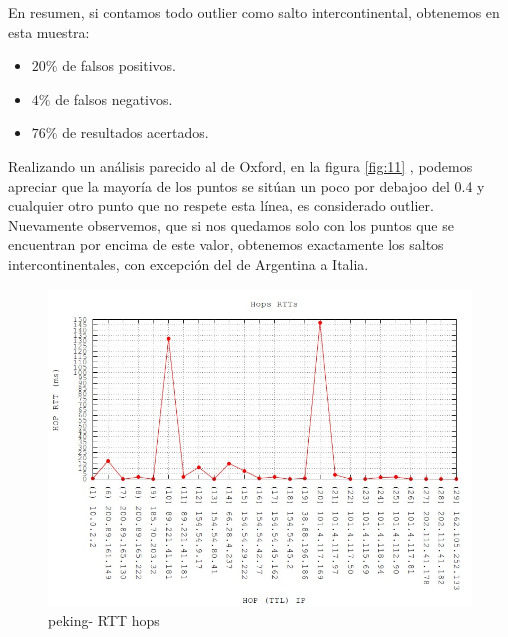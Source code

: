 En resumen, si contamos todo outlier como salto intercontinental, obtenemos en esta muestra:

\begin{itemize}
	\item $20 \% $ de falsos positivos.
	\item $4 \%$ de falsos negativos.
	\item $76 \%$ de resultados acertados.
\end{itemize}

Realizando un análisis parecido al de Oxford, en la figura \ref{fig:11} , podemos apreciar que la mayoría de los puntos se sitúan un poco por debajoo del 0.4 y cualquier otro punto que no respete esta línea, es considerado outlier. Nuevamente observemos, que si nos quedamos solo con los puntos que se encuentran por encima de este valor, obtenemos exactamente los saltos intercontinentales, con excepción del de Argentina a Italia. 

\begin{figure}[!htbp]
  \centering
    \includegraphics[scale=0.5]{imagenes/peking-graficos/traceroute-peking.jpg}
  \caption{peking- RTT hops}
  \label{fig:10}
\end{figure}


